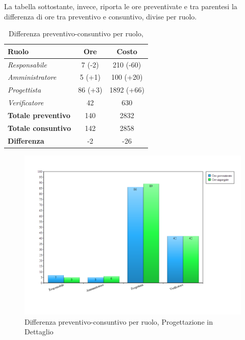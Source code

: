 \newpage
La tabella sottostante, invece, riporta le ore preventivate e  tra parentesi la differenza di ore tra preventivo e consuntivo, divise per ruolo.

\begin{table}[H]
	\begin{center}
		\begin{tabular}{|l|c|c|}
			\hline
			\textbf{Ruolo}	& \textbf{Ore} & \textbf{Costo} \\
			\hline
			\textit{Responsabile}		&	7 (-2)	&	210 (-60) 		\\
			\hline
			\textit{Amministratore}		&	5 (+1)	&	100	(+20)		\\
			\hline
			\textit{Progettista}		&	86 (+3)	&	1892 (+66) 		\\
			\hline
			\textit{Verificatore}		&	42 		&	630 			\\
			\hline
			\textbf{Totale preventivo}	&	140		& 	2832			\\
			\hline
			\textbf{Totale consuntivo}	&	142		&  	2858			\\
			\hline
			\textbf{Differenza} 		&	-2		&	-26				\\
			\hline
		\end{tabular}
	\end{center}
	\caption{Differenza preventivo-consuntivo per ruolo, \PD}
\end{table}

\begin{figure}[H]
	\centering
	\includegraphics[scale=0.4]{immagini/Grafi/ProgettazioneDettaglio_oreRuolo.png}
	\caption{Differenza preventivo-consuntivo per ruolo, Progettazione in Dettaglio}
\end{figure}
\FloatBarrier

